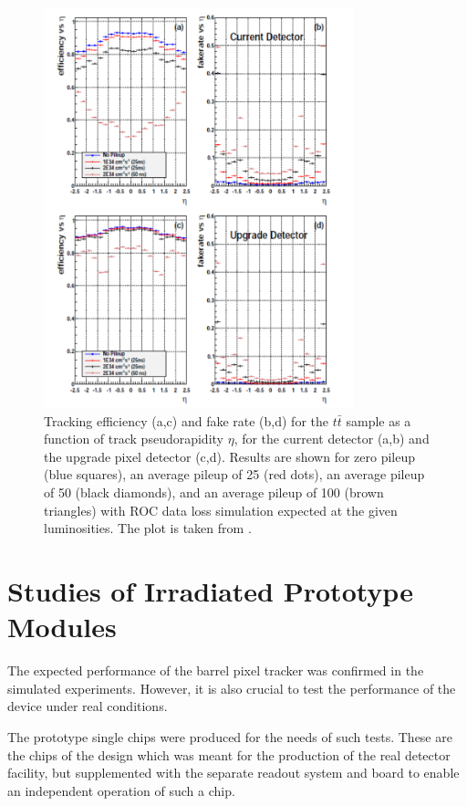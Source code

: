 \begin{figure}[p]
 \centering
 \includegraphics[width=0.8\textwidth]{021_pixel_upgrade/plots/sim_perform.pdf}
 \caption{Tracking efficiency (a,c) and fake rate (b,d) for the $t\bar{t}$ sample as a function of track
          pseudorapidity $\eta$, for the current detector (a,b) and the upgrade pixel detector (c,d). Results are shown for
          zero pileup (blue squares), an average pileup of 25 (red dots), an average pileup of 50 (black
          diamonds), and an average pileup of 100 (brown triangles) with ROC data loss simulation
          expected at the given luminosities. The plot is taken from \cite{CMS:2012sda}.}
 \label{fig:sim_perform}
\end{figure}


\section{Studies of Irradiated Prototype Modules}

The expected performance of the barrel pixel tracker was confirmed in the simulated experiments. However, it is also crucial to test 
the performance of the device under real conditions. 

The prototype single chips were produced for the needs of such tests. These are the chips of the design which was meant for the production
of the real detector facility, but supplemented with the separate readout system and board to enable an independent operation of such
a chip. 

